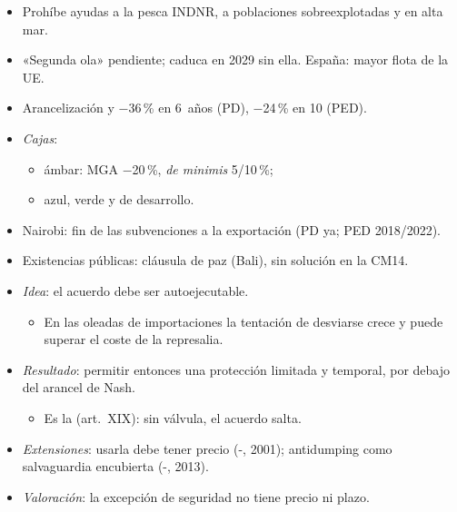 \documentclass{article}
\begin{document}
\begin{columnas}
\begin{itemize}
\begin{itemize}
  \item Prohíbe ayudas a la pesca INDNR, a poblaciones sobreexplotadas y en alta mar.
  \item «Segunda ola» pendiente; caduca en 2029 sin ella. España: mayor flota de la UE.
  \end{itemize}
\end{itemize}
\begin{itemize}
\item Arancelización y $-$36\,\% en 6~años (PD), $-$24\,\% en 10 (PED).
\item \emph{Cajas}:
  \begin{itemize}
  \item \textcolor{tceedorado}{ámbar}: MGA $-$20\,\%, \emph{de minimis} 5/10\,\%;
  \item \textcolor{tceeazul}{azul}, \textcolor{tceeverde}{verde} y de desarrollo.
  \end{itemize}
\item Nairobi: fin de las subvenciones a la exportación (PD ya; PED 2018/2022).
\item Existencias públicas: cláusula de paz (Bali), sin solución en la CM14.
\end{itemize}
\begin{itemize}
\item \emph{Idea}: el acuerdo debe ser autoejecutable.
  \begin{itemize}
  \item En las oleadas de importaciones la tentación de desviarse crece y puede superar el coste de la represalia.
  \end{itemize}
\item \emph{Resultado}: permitir entonces una protección limitada y temporal, por debajo del arancel de Nash.
  \begin{itemize}
  \item Es la  (art.~XIX): sin válvula, el acuerdo salta.
  \end{itemize}
\item \emph{Extensiones}: usarla debe tener precio (-, 2001); antidumping como salvaguardia encubierta (-, 2013).
\item \emph{Valoración}: la excepción de seguridad no tiene precio ni plazo.
\end{itemize}
\begin{itemize}

\end{itemize}
\end{columnas}
\end{document}
